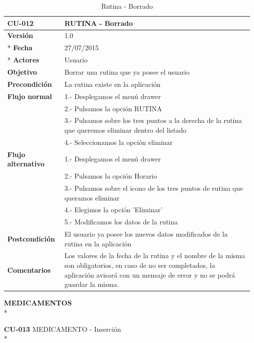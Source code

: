 \documentclass[../pfc.tex]{subfiles}
\begin{document}
		\begin{table}[H]
			\centering
			\begin{tabular}[t]{|p{3cm}|p{9.5cm}|}
				\hline \textbf{CU-012} & \textbf{RUTINA - Borrado} \\*
				\hline\hline \textbf{Versión} & 1.0 \\ *
				\hline\hline \textbf{Fecha} & 27/07/2015 \\ *
				\hline\textbf{Actores} 	& Usuario\\*
				\hline \textbf{Objetivo} & Borrar una rutina que ya posee el usuario\\* 			
				\hline \textbf{Precondición} & La rutina existe en la aplicación\\* 
				\hline \textbf{Flujo normal} & 1.- Desplegamos el menú drawer \\* 
				& 2.- Pulsamos la opción RUTINA\\*	
				& 3.- Pulsamos sobre los tres puntos a la derecha de la rutina que queremos eliminar dentro del listado\\*	
				& 4.- Seleccionamos la opción eliminar\\*	
				\hline \textbf{Flujo alternativo} & 1.- Desplegamos el menú drawer \\* 
				& 2.- Pulsamos la opción Horario \\*	
				& 3.- Pulsamos sobre el icono de los tres puntos de rutina que queramos eliminar \\*	
				& 4.- Elegimos la opción 'Eliminar'\\*	
				& 5.- Modificamos los datos de la rutina\\*	
				\hline \textbf{Postcondición} & El usuario ya posee los nuevos datos modificados de la rutina en la aplicación \\* 
				\hline \textbf{Comentarios}   & Los valores de la fecha de la rutina y el nombre de la misma son obligatorios, en caso de no ser completados, la aplicación avisará con un mensaje de error y no se podrá guardar la misma.\\*
				\hline
			\end{tabular}
			\caption{Rutina - Borrado}
			\label{tabla:caso012}
		\end{table}
		
		
		
		\textbf{MEDICAMENTOS}\\*
		
		\textbf{CU-013}	MEDICAMENTO - Inserción\\*
		
\end{document}
